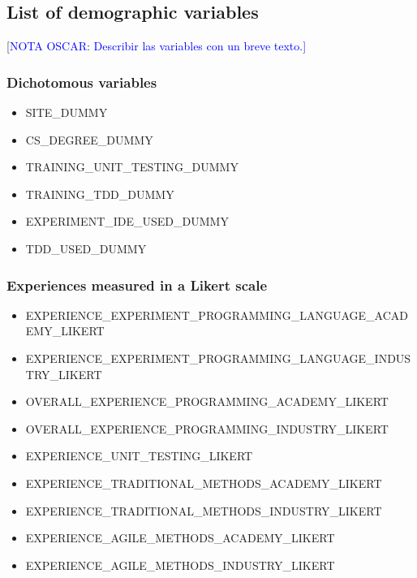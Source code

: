 \documentclass[10pt,conference]{IEEEtran}\usepackage[]{graphicx}\usepackage[table,xcdraw]{xcolor}
\newcommand{\odnote}[1]{[\textcolor{blue}{NOTA OSCAR: #1]~}}
\begin{document}
\onecolumn

\appendix

\subsection{List of demographic variables}\label{sec:appendix:demographic-variables}

\odnote{Describir las variables con un breve texto.}

\subsubsection{Dichotomous variables}
\begin{itemize}
    \item SITE\_DUMMY
    \item CS\_DEGREE\_DUMMY
    \item TRAINING\_UNIT\_TESTING\_DUMMY
    \item TRAINING\_TDD\_DUMMY
    \item EXPERIMENT\_IDE\_USED\_DUMMY
    \item TDD\_USED\_DUMMY
\end{itemize}

\subsubsection{Experiences measured in a Likert scale}
\begin{itemize}
    \item EXPERIENCE\_EXPERIMENT\_PROGRAMMING\_LANGUAGE\_ACADEMY\_LIKERT
    \item EXPERIENCE\_EXPERIMENT\_PROGRAMMING\_LANGUAGE\_INDUSTRY\_LIKERT
    \item OVERALL\_EXPERIENCE\_PROGRAMMING\_ACADEMY\_LIKERT
    \item OVERALL\_EXPERIENCE\_PROGRAMMING\_INDUSTRY\_LIKERT
    \item EXPERIENCE\_UNIT\_TESTING\_LIKERT
    \item EXPERIENCE\_TRADITIONAL\_METHODS\_ACADEMY\_LIKERT
    \item EXPERIENCE\_TRADITIONAL\_METHODS\_INDUSTRY\_LIKERT
    \item EXPERIENCE\_AGILE\_METHODS\_ACADEMY\_LIKERT
    \item EXPERIENCE\_AGILE\_METHODS\_INDUSTRY\_LIKERT
\end{itemize}
\end{document}
